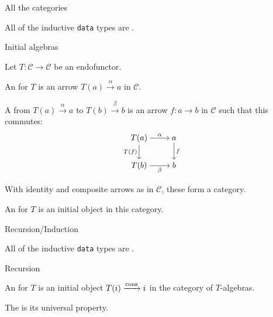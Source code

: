 
\begin{frame}{All the categories} %
  
  \par All of the inductive \texttt{data} types are .

  \begin{block}{Initial algebras}
    
    \par Let $T : \mathcal{C} \to \mathcal{C}$ be an endofunctor.
    \vspace{0.5 \baselineskip}
    \pause
    \par An  for $T$ is an arrow $T(a) \xrightarrow{\alpha} a$ in $\mathcal{C}$.
    \vspace{0.5 \baselineskip}
    \pause
    \par A  from $T(a) \xrightarrow{\alpha} a$ to $T(b) \xrightarrow{\beta} b$ is an arrow $f : a \to b$ in $\mathcal{C}$ such that this commutes:
    \begin{align*}
      \begin{tikzcd}[cramped, ampersand replacement = \;]
        T(a) \arrow[r, "\alpha"] \arrow[d, "T(f)"'] \; a \arrow[d, "f"] \\
        T(b) \arrow[r, "\beta"'] \; b
      \end{tikzcd}
    \end{align*}
    \vspace{-0.5 \baselineskip}
    \pause
    \par With identity and composite arrows as in $\mathcal{C}$, these form a category.
    \vspace{0.5 \baselineskip}
    \pause
    \par An  for $T$ is an initial object in this category.
    
  \end{block}

\end{frame}

\begin{frame}{Recursion/Induction} %

  \par All of the inductive \texttt{data} types are .
  
  \pause
  
  \begin{block}{Recursion}

    \par An  for $T$ is an initial object $T(i) \xrightarrow{\operatorname{cons}} i$ in the category of $T$-algebras.
    \vspace{0.5 \baselineskip}
    \pause
    \par The  is its universal property.
    
  \end{block}

\end{frame}

